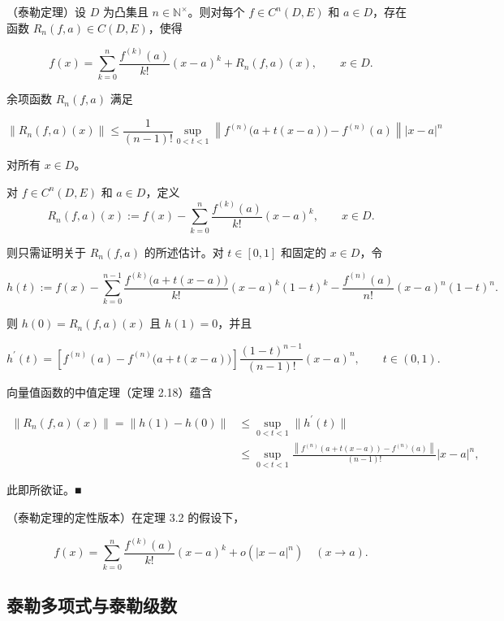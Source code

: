 \begin{theorem}

（泰勒定理）设 $D$ 为凸集且 $n \in \mathbb{N}^\times$。则对每个 $f \in C^n(D, E)$ 和 $a \in D$，存在函数 $R_n(f, a) \in C(D, E)$，使得

\[
f(x)=\sum_{k=0}^{n}\frac{f^{(k)}(a)}{k!}(x-a)^{k}+R_{n}(f,a)(x),\qquad x\in D.
\]

余项函数 $ R_{n}(f,a) $ 满足

\[
\left\|R_{n}(f,a)(x)\right\|\leq\frac{1}{(n-1)!}\sup_{0<t<1}\left\|f^{(n)}\big(a+t(x-a)\big)-f^{(n)}(a)\right\||x-a|^{n}
\]

对所有 $ x \in D $。

\proofhead
对 $ f \in C^n(D, E) $ 和 $ a \in D $，定义
\[
R_{n}(f,a)(x):=f(x)-\sum_{k=0}^{n}\frac{f^{(k)}(a)}{k!}(x-a)^{k},\qquad x\in D.
\]

则只需证明关于 $ R_n(f, a) $ 的所述估计。对 $ t \in [0,1] $ 和固定的 $ x \in D $，令

\[
h(t):=f(x)-\sum_{k=0}^{n-1}\frac{f^{(k)}\big(a+t(x-a)\big)}{k!}(x-a)^{k}(1-t)^{k}-\frac{f^{(n)}(a)}{n!}(x-a)^{n}(1-t)^{n}.
\]

则 $ h(0) = R_{n}(f, a)(x) $ 且 $ h(1) = 0 $，并且

\[
h^{\prime}(t)=\left[f^{(n)}(a)-f^{(n)}\big(a+t(x-a)\big)\right]\frac{(1-t)^{n-1}}{(n-1)!}(x-a)^{n},\qquad t\in(0,1).
\]

向量值函数的中值定理（定理 2.18）蕴含

\begin{equation*}
\begin{aligned}
\|R_{n}(f,a)(x)\|=\|h(1)-h(0)\|&\leq\sup_{0<t<1}\|h^{\prime}(t)\|\\&\leq\sup_{0<t<1}\frac{\left\|f^{(n)}\left(a+t(x-a)\right)-f^{(n)}(a)\right\|}{(n-1)!}\left|x-a\right|^{n},
\end{aligned}
\end{equation*}

此即所欲证。■

\end{theorem}

\begin{corollary}

（泰勒定理的定性版本）在定理 3.2 的假设下，

\[
f(x)=\sum_{k=0}^{n}\frac{f^{(k)}(a)}{k!}(x-a)^{k}+o(|x-a|^{n})\quad(x\to a).
\]
\end{corollary}

\subsection*{泰勒多项式与泰勒级数}

